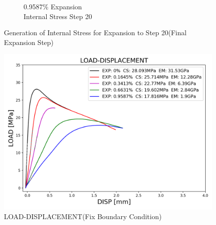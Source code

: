 \begin{figure}[ht!]
\begin{subfigure}{.25\textwidth}
      \caption{0.9587\% Expansion\\Internal Stress Step 20}
    \end{subfigure}

\caption{Generation of Internal Stress for Expansion to Step 20(Final Expansion Step)}
\label{fig:A15_stress}
\end{figure}

\begin{figure}[ht!]
    \centering
    \includegraphics[width=0.8\linewidth]{Files/exp_3D/DEF/S13A15FIXX0-LOAD-DISPLACEMENT.png}
    \caption{LOAD-DISPLACEMENT(Fix Boundary Condition)}
    \label{fig:S13A15FIXX0-LOAD-DISPLACEMENT}
\end{figure}
